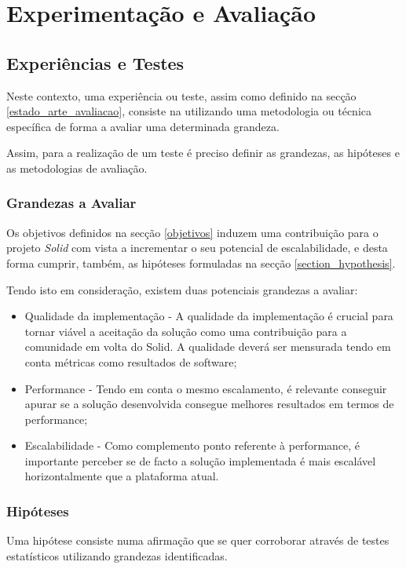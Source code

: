 
\chapter{Experimentação e Avaliação}
\label{cap:6}

\section{Experiências e Testes}
Neste contexto, uma experiência ou teste, assim como definido na secção \ref{estado_arte_avaliacao}, consiste na utilizando uma metodologia ou técnica específica de forma a avaliar uma determinada grandeza.

Assim, para a realização de um teste é preciso definir as grandezas, as hipóteses e as metodologias de avaliação.

\subsection{Grandezas a Avaliar}
Os objetivos definidos na secção \ref{objetivos} induzem uma contribuição para o projeto \emph{Solid} com vista a incrementar o seu potencial de escalabilidade, e desta forma cumprir, também, as hipóteses formuladas na secção \ref{section_hypothesis}.

Tendo isto em consideração, existem duas potenciais grandezas a avaliar:
\begin{itemize}
    \item Qualidade da implementação - A qualidade da implementação é crucial para tornar viável a aceitação da solução como uma contribuição para a comunidade em volta do Solid. A qualidade deverá ser mensurada tendo em conta métricas como resultados de software;
    \item Performance - Tendo em conta o mesmo escalamento, é relevante conseguir apurar se a solução desenvolvida consegue melhores resultados em termos de performance;
    \item Escalabilidade - Como complemento ponto referente à performance, é importante perceber se de facto a solução implementada é mais escalável horizontalmente que a plataforma atual.
\end{itemize}

\subsection{Hipóteses \label{avaliacao_experimentacao_hypothesis}}
Uma hipótese consiste numa afirmação que se quer corroborar através de testes estatísticos utilizando grandezas identificadas.

